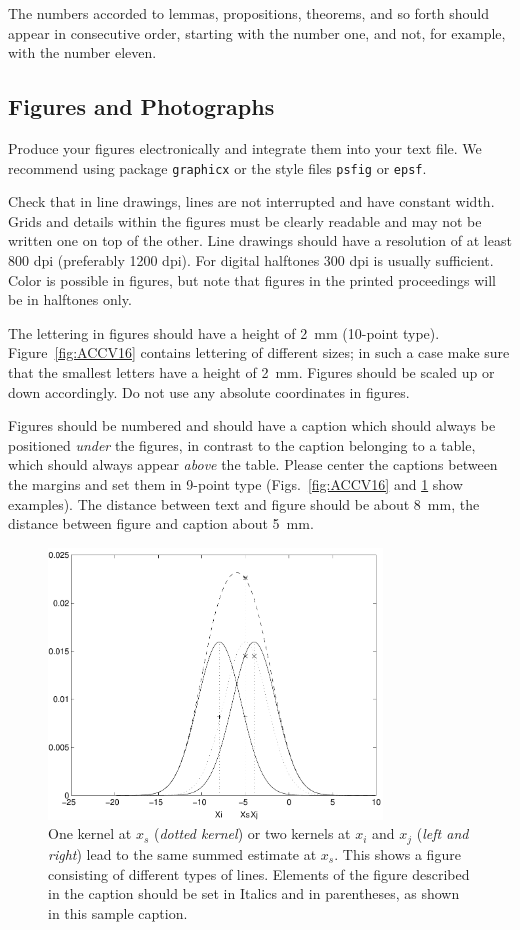 \documentclass[runningheads]{llncs}
\begin{document}
The numbers accorded to lemmas, propositions, theorems, and so forth should
appear in consecutive order, starting with the number one, and not, for
example, with the number eleven.

\subsection{Figures and Photographs}
\label{sect:figures}

Produce your figures electronically and integrate
them into your text file. We recommend using package
\verb+graphicx+ or the style files \verb+psfig+ or \verb+epsf+.

Check that in line drawings, lines are not
interrupted and have constant width. Grids and details within the
figures must be clearly readable and may not be written one on top of
the other. Line drawings should have a resolution of at least 800 dpi
(preferably 1200 dpi).
For digital halftones 300 dpi is usually sufficient. Color is possible in
figures, but note that figures in the printed proceedings will be in 
halftones only.

The lettering in figures should have a height of 2~mm (10-point type).
Figure~\ref{fig:ACCV16} contains lettering of different sizes; in such a case make sure that the smallest letters have a height of 2~mm.
Figures should be scaled up or down accordingly.
Do not use any absolute coordinates in figures.

Figures should be numbered and should have a caption which should
always be positioned {\it under} the figures, in contrast to the caption
belonging to a table, which should always appear {\it above} the table.
Please center the captions between the margins and set them in
9-point type (Figs.~\ref{fig:ACCV16} and \ref{fig:example} show examples).
The distance between text and figure should be about 8~mm, the
distance between figure and caption about 5~mm.
%
\begin{figure}
\centering
\includegraphics[height=72mm]{eijkel2}
\caption{
One kernel at $x_s$ ({\it dotted kernel}) or two kernels at
$x_i$ and $x_j$ ({\it left and right}) lead to the same summed estimate
at $x_s$. This shows a figure consisting of different types of
lines. Elements of the figure described in the caption should be set in
Italics and in parentheses, as shown in this sample caption.
}
\label{fig:example}
\end{figure}
\end{document}

